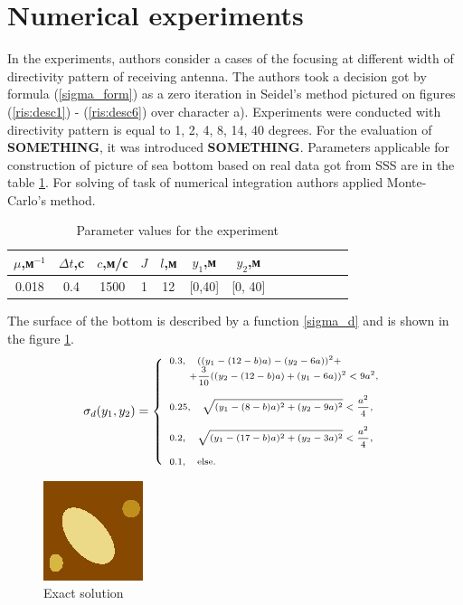 \documentclass{procDDs}
\begin{document}
\section{Numerical experiments}
In the experiments, authors consider a cases of the focusing at different width of directivity pattern of receiving antenna. The authors took a decision got by formula (\ref{sigma_form}) as a zero iteration in Seidel's method pictured on figures (\ref{ris:desc1}) - (\ref{ris:desc6}) over character a). Experiments were conducted with directivity pattern is equal to  1, 2, 4, 8, 14, 40 degrees. For the evaluation of \textbf{SOMETHING}, it was introduced \textbf{SOMETHING}. 
Parameters applicable for construction of picture of sea bottom based on real data got from SSS are in the table \ref{table:name}. For solving of task of numerical integration authors applied Monte-Carlo's method.
\begin{table}[!ht]
	\begin{tabular}{|c|c|c|c|c|c|c|c|c|c|c|c|c|}
		\hline
			$\mu$,м$^{-1}$ & $\Delta t$,c & $c$,м/с & $J$ & $l$,м & $y_1$,м & $y_2$,м\\
			\hline
			0.018 & 0.4 & 1500 & 1 & 12 & [0,40] & [0, 40]\\ \hline
	\end{tabular}
	\label{table:name}
	\caption{Parameter values for the experiment}
\end{table}
The surface of the bottom is described by a function \ref{sigma_d} and is shown in the figure \ref{ris:dno}.
\begin{equation}
\scriptsize
	\label{sigma_d}
	\sigma_d(y_1, y_2) = 
	\left\{
	\begin{array}{ll}
		0.3 , \quad  ((y_1-(12-b)a)-(y_2-6a))^2+\\ \quad \quad +\dfrac{3}{10}((y_2-(12-b)a)+(y_1-6a))^2<9a^2,  \\ \\
		0.25, \quad \sqrt{(y_1-(8-b)a)^2+(y_2-9a)^2}<\dfrac{a^2}{4}, \\ \\
		0.2 ,\quad  \sqrt{(y_1-(17-b)a)^2+(y_2-3a)^2}<\dfrac{a^2}{4}, \\ \\
		0.1 , \quad \hbox{else.} \\
	\end{array}%
	\right.
\end{equation}
\begin{figure}[h!]\center
	
		\includegraphics[width=0.3\linewidth]{img/dno.jpg}
	\caption{Exact solution}
	\label{ris:dno}
\end{figure}
\end{document}
